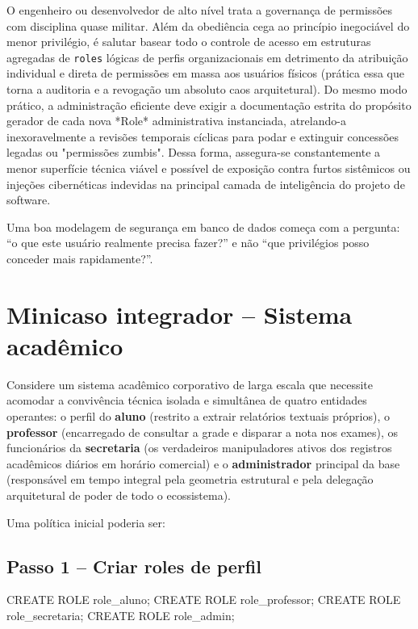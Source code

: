O engenheiro ou desenvolvedor de alto nível trata a governança de permissões com disciplina quase militar. Além da obediência cega ao princípio inegociável do menor privilégio, é salutar basear todo o controle de acesso em estruturas agregadas de \texttt{roles} lógicas de perfis organizacionais em detrimento da atribuição individual e direta de permissões em massa aos usuários físicos (prática essa que torna a auditoria e a revogação um absoluto caos arquitetural). Do mesmo modo prático, a administração eficiente deve exigir a documentação estrita do propósito gerador de cada nova *Role* administrativa instanciada, atrelando-a inexoravelmente a revisões temporais cíclicas para podar e extinguir concessões legadas ou "permissões zumbis". Dessa forma, assegura-se constantemente a menor superfície técnica viável e possível de exposição contra furtos sistêmicos ou injeções cibernéticas indevidas na principal camada de inteligência do projeto de software.

\begin{quadro_dica}
Uma boa modelagem de segurança em banco de dados começa com a pergunta: “o que este usuário realmente precisa fazer?” e não “que privilégios posso conceder mais rapidamente?”.
\end{quadro_dica}

\section{Minicaso integrador -- Sistema acadêmico}

Considere um sistema acadêmico corporativo de larga escala que necessite acomodar a convivência técnica isolada e simultânea de quatro entidades operantes: o perfil do \textbf{aluno} (restrito a extrair relatórios textuais próprios), o \textbf{professor} (encarregado de consultar a grade e disparar a nota nos exames), os funcionários da \textbf{secretaria} (os verdadeiros manipuladores ativos dos registros acadêmicos diários em horário comercial) e o \textbf{administrador} principal da base (responsável em tempo integral pela geometria estrutural e pela delegação arquitetural de poder de todo o ecossistema).

Uma política inicial poderia ser:

\subsection*{Passo 1 -- Criar roles de perfil}

\begin{sqlcode}
CREATE ROLE role_aluno;
CREATE ROLE role_professor;
CREATE ROLE role_secretaria;
CREATE ROLE role_admin;
\end{sqlcode}

